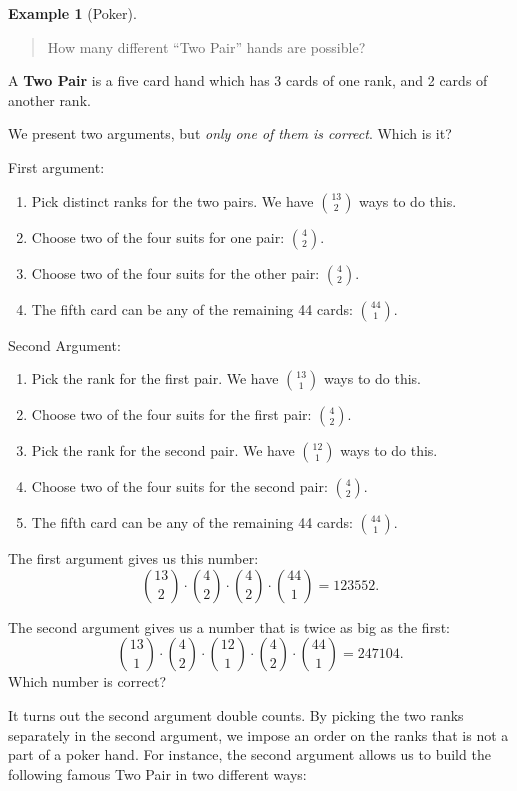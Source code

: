 \documentclass[
]{book}
\providecommand{\tightlist}{%
  \setlength{\itemsep}{0pt}\setlength{\parskip}{0pt}}
\theoremstyle{definition}
\theoremstyle{definition}
\newtheorem{example}{Example}[chapter]
\theoremstyle{definition}
\theoremstyle{definition}
\theoremstyle{remark}
\begin{document}
\begin{example}[Poker]
\begin{quote}
How many different ``Two Pair'' hands are possible?
\end{quote}

A \textbf{Two Pair} is a five card hand which has 3 cards of one rank, and 2 cards of another rank.

We present two arguments, but \emph{only one of them is correct}. Which is it?

First argument:

\begin{enumerate}
\def\labelenumi{\arabic{enumi}.}
\tightlist
\item
  Pick distinct ranks for the two pairs. We have \(\binom{13}{2}\) ways to do this.
\item
  Choose two of the four suits for one pair: \(\binom{4}{2}\).
\item
  Choose two of the four suits for the other pair: \(\binom{4}{2}\).
\item
  The fifth card can be any of the remaining 44 cards: \(\binom{44}{1}\).
\end{enumerate}

Second Argument:

\begin{enumerate}
\def\labelenumi{\arabic{enumi}.}
\tightlist
\item
  Pick the rank for the first pair. We have \(\binom{13}{1}\) ways to do this.
\item
  Choose two of the four suits for the first pair: \(\binom{4}{2}\).
\item
  Pick the rank for the second pair. We have \(\binom{12}{1}\) ways to do this.
\item
  Choose two of the four suits for the second pair: \(\binom{4}{2}\).
\item
  The fifth card can be any of the remaining 44 cards: \(\binom{44}{1}\).
\end{enumerate}

The first argument gives us this number:
\[\binom{13}{2}\cdot\binom{4}{2}\cdot \binom{4}{2} \cdot \binom{44}{1} = 123552.\]

The second argument gives us a number that is twice as big as the first:
\[\binom{13}{1}\cdot\binom{4}{2} \cdot \binom{12}{1} \cdot \binom{4}{2} \cdot \binom{44}{1} = 247104.\]
Which number is correct?

It turns out the second argument double counts. By picking the two ranks separately in the second argument, we impose an order on the ranks that is not a part of a poker hand. For instance, the second argument allows us to build the following famous Two Pair in two different ways:


\end{example}
\end{document}
